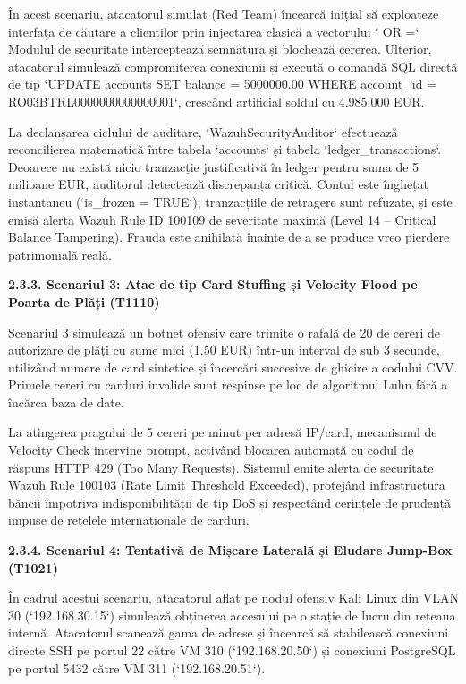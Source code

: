 \documentclass[
]{article}
\begin{document}
În acest scenariu, atacatorul simulat (Red Team) încearcă inițial să
exploateze interfața de căutare a clienților prin injectarea clasică a
vectorului `\textquotesingle{} OR
\textquotesingle=`. Modulul de
securitate interceptează semnătura și blochează cererea. Ulterior,
atacatorul simulează compromiterea conexiunii și execută o comandă SQL
directă de tip `UPDATE accounts SET balance = 5000000.00 WHERE
account\_id =
\textquotesingle RO03BTRL0000000000000001\textquotesingle`, crescând
artificial soldul cu 4.985.000 EUR.

La declanșarea ciclului de auditare, `WazuhSecurityAuditor` efectuează
reconcilierea matematică între tabela `accounts` și tabela
`ledger\_transactions`. Deoarece nu există nicio tranzacție
justificativă în ledger pentru suma de 5 milioane EUR, auditorul
detectează discrepanța critică. Contul este înghețat instantaneu
(`is\_frozen = TRUE`), tranzacțiile de retragere sunt refuzate, și este
emisă alerta Wazuh Rule ID 100109 de severitate maximă (Level 14 --
Critical Balance Tampering). Frauda este anihilată înainte de a se
produce vreo pierdere patrimonială reală.

\textbf{2.3.3. Scenariul 3: Atac de tip Card Stuffing și Velocity Flood
pe Poarta de Plăți (T1110)}

Scenariul 3 simulează un botnet ofensiv care trimite o rafală de 20 de
cereri de autorizare de plăți cu sume mici (1.50 EUR) într-un interval
de sub 3 secunde, utilizând numere de card sintetice și încercări
succesive de ghicire a codului CVV. Primele cereri cu carduri invalide
sunt respinse pe loc de algoritmul Luhn fără a încărca baza de date.

La atingerea pragului de 5 cereri pe minut per adresă IP/card,
mecanismul de Velocity Check intervine prompt, activând blocarea
automată cu codul de răspuns HTTP 429 (Too Many Requests). Sistemul
emite alerta de securitate Wazuh Rule 100103 (Rate Limit Threshold
Exceeded), protejând infrastructura băncii împotriva indisponibilității
de tip DoS și respectând cerințele de prudență impuse de rețelele
internaționale de carduri.

\textbf{2.3.4. Scenariul 4: Tentativă de Mișcare Laterală și Eludare
Jump-Box (T1021)}

În cadrul acestui scenariu, atacatorul aflat pe nodul ofensiv Kali Linux
din VLAN 30 (`192.168.30.15`) simulează obținerea accesului pe o stație
de lucru din rețeaua internă. Atacatorul scanează gama de adrese și
încearcă să stabilească conexiuni directe SSH pe portul 22 către VM 310
(`192.168.20.50`) și conexiuni PostgreSQL pe portul 5432 către VM 311
(`192.168.20.51`).
\end{document}

